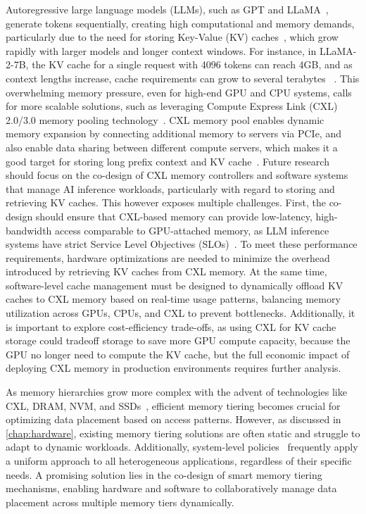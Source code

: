 Autoregressive large language models (LLMs), such as GPT and LLaMA~\cite{gpt1, gpt2, gpt3, llama2}, generate tokens sequentially, creating high computational and memory demands, particularly due to the need for storing Key-Value (KV) caches~\cite{pagedattenion, distserve, memserve}, which grow rapidly with larger models and longer context windows. For instance, in LLaMA-2-7B, the KV cache for a single request with 4096 tokens can reach 4GB, and as context lengths increase, cache requirements can grow to several terabytes ~\cite{pagedattenion,liu2023cachegen}. This overwhelming memory pressure, even for high-end GPU and CPU systems, calls for more scalable solutions, such as leveraging Compute Express Link (CXL) 2.0/3.0 memory pooling technology~\cite{pond, cxltradeoff, hybridcxleval}. CXL memory pool enables dynamic memory expansion by connecting additional memory to servers via PCIe, and also enable data sharing between different compute servers, which makes it a good target for storing long prefix context and KV cache~\cite{cacheblend}. Future research should focus on the co-design of CXL memory controllers and software systems that manage AI inference workloads, particularly with regard to storing and retrieving KV caches. This however exposes multiple challenges. First, the co-design should ensure that CXL-based memory can provide low-latency, high-bandwidth access comparable to GPU-attached memory, as LLM inference systems have strict Service Level Objectives (SLOs)~\cite{slo}. To meet these performance requirements, hardware optimizations are needed to minimize the overhead introduced by retrieving KV caches from CXL memory. At the same time, software-level cache management must be designed to dynamically offload KV caches to CXL memory based on real-time usage patterns, balancing memory utilization across GPUs, CPUs, and CXL to prevent bottlenecks. Additionally, it is important to explore cost-efficiency trade-offs, as using CXL for KV cache storage could tradeoff storage to save more GPU compute capacity, because the GPU no longer need to compute the KV cache, but the full economic impact of deploying CXL memory in production environments requires further analysis.

As memory hierarchies grow more complex with the advent of technologies like CXL, DRAM, NVM, and SSDs~\cite{zhong2024managing}, efficient memory tiering becomes crucial for optimizing data placement based on access patterns. However, as discussed in \ref{chap:hardware}, existing memory tiering solutions are often static and struggle to adapt to dynamic workloads. Additionally, system-level policies~\cite{hot, tpp} frequently apply a uniform approach to all heterogeneous applications, regardless of their specific needs. A promising solution lies in the co-design of smart memory tiering mechanisms, enabling hardware and software to collaboratively manage data placement across multiple memory tiers dynamically.

